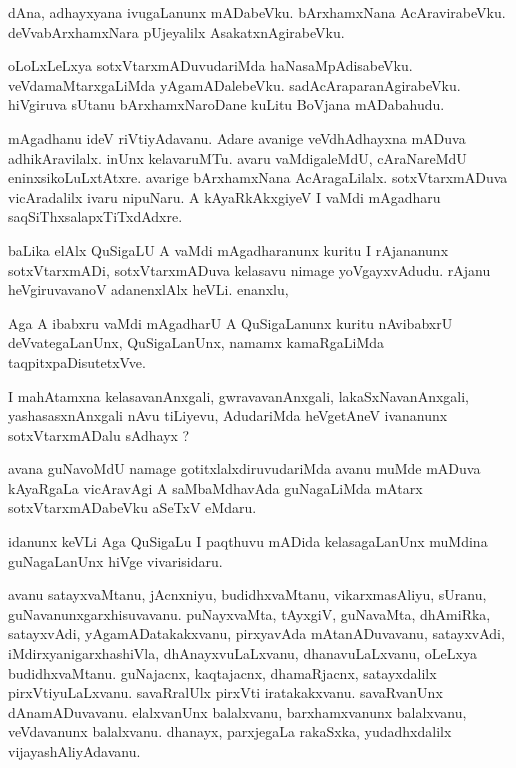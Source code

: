 \documentclass{article}
\begin{document}
\begin{mn}
dAna, adhayxyana ivugaLanunx mADabeVku. bArxhamxNana AcAravirabeVku.  
deVvabArxhamxNara pUjeyalilx AsakatxnAgirabeVku.
\end{mn}

\begin{mn}
oLoLxLeLxya sotxVtarxmADuvudariMda  haNasaMpAdisabeVku. veVdamaMtarxgaLiMda 
yAgamADalebeVku.  sadAcAraparanAgirabeVku.  hiVgiruva sUtanu bArxhamxNaroDane 
kuLitu BoVjana mADabahudu.
\end{mn}

\begin{mn}
mAgadhanu ideV riVtiyAdavanu.  Adare avanige veVdhAdhayxna mADuva adhikAravilalx.  
inUnx kelavaruMTu. avaru vaMdigaleMdU, cAraNareMdU eninxsikoLuLxtAtxre.  
avarige  bArxhamxNana  AcAragaLilalx. sotxVtarxmADuva vicAradalilx ivaru 
nipuNaru. A kAyaRkAkxgiyeV I vaMdi mAgadharu  saqSiThxsalapxTiTxdAdxre.
\end{mn}

\begin{mn}
baLika elAlx QuSigaLU A vaMdi mAgadharanunx kuritu I rAjananunx sotxVtarxmADi, 
sotxVtarxmADuva kelasavu nimage yoVgayxvAdudu. rAjanu heVgiruvavanoV 
adanenxlAlx heVLi. enanxlu,
\end{mn}

\begin{mn}
Aga A ibabxru vaMdi mAgadharU A QuSigaLanunx kuritu nAvibabxrU deVvategaLanUnx, 
QuSigaLanUnx, namamx kamaRgaLiMda taqpitxpaDisutetxVve.
\end{mn}

\begin{mn}
I mahAtamxna kelasavanAnxgali,  gwravavanAnxgali,  lakaSxNavanAnxgali, 
yashasasxnAnxgali nAvu tiLiyevu, AdudariMda heVgetAneV ivananunx sotxVtarxmADalu sAdhayx ?
\end{mn}

\begin{mn}
avana guNavoMdU namage gotitxlalxdiruvudariMda  avanu muMde mADuva kAyaRgaLa 
vicAravAgi A saMbaMdhavAda guNagaLiMda mAtarx sotxVtarxmADabeVku aSeTxV eMdaru. 
\end{mn}

\begin{mn}
idanunx keVLi Aga QuSigaLu I paqthuvu mADida kelasagaLanUnx muMdina guNagaLanUnx hiVge vivarisidaru. 
\end{mn}

\begin{mn}
avanu satayxvaMtanu, jAcnxniyu, budidhxvaMtanu, vikarxmasAliyu, sUranu, 
guNavanunxgarxhisuvavanu.  puNayxvaMta, tAyxgiV, guNavaMta, dhAmiRka, 
satayxvAdi, yAgamADatakakxvanu, pirxyavAda mAtanADuvavanu, satayxvAdi, 
iMdirxyanigarxhashiVla, dhAnayxvuLaLxvanu, dhanavuLaLxvanu, oLeLxya 
budidhxvaMtanu. guNajacnx, kaqtajacnx, dhamaRjacnx, satayxdalilx 
pirxVtiyuLaLxvanu.  savaRralUlx pirxVti iratakakxvanu.  savaRvanUnx  
dAnamADuvavanu. elalxvanUnx balalxvanu, barxhamxvanunx balalxvanu, veVdavanunx
 balalxvanu.  dhanayx, parxjegaLa rakaSxka, yudadhxdalilx vijayashAliyAdavanu.
\end{mn}
\end{document}
